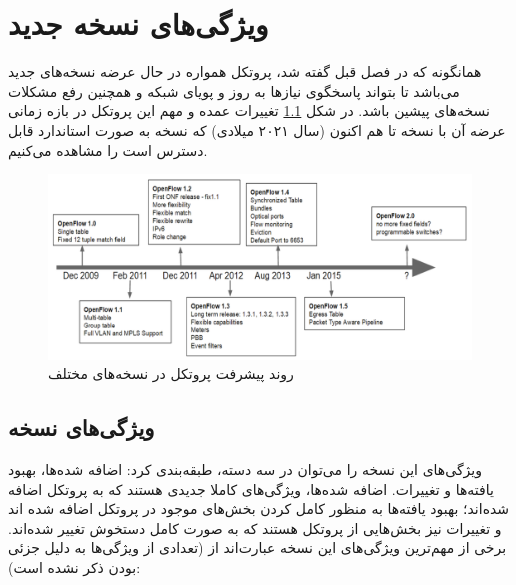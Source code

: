 \chapter{ویژگی‌های نسخه جدید }
همانگونه که در فصل قبل گفته شد، پروتکل  همواره در حال عرضه نسخه‌های جدید می‌باشد تا بتواند پاسخگوی نیاز‌ها به روز و پویای شبکه و همچنین رفع مشکلات نسخه‌های پیشین باشد. در شکل \ref{fig7} تغییرات عمده و مهم این پروتکل در بازه زمانی عرضه آن با نسخه  تا هم اکنون (سال ۲۰۲۱ میلادی) که نسخه  به صورت استاندارد قابل دسترس است را مشاهده می‌کنیم.

\begin{figure}[H]
	\centering
	\includegraphics[scale=0.4]{imgs/of_timeline.png}
	\caption{روند پیشرفت پروتکل در نسخه‌های مختلف}
	\label{fig7}
\end{figure}

\pagebreak

\section{ویژگی‌های نسخه }
ویژگی‌های این نسخه را می‌توان در سه دسته، طبقه‌بندی کرد: اضافه شده‌ها، بهبود یافته‌ها و تغییرات. اضافه شده‌ها، ویژگی‌های کاملا جدیدی هستند که به پروتکل اضافه شده‌اند؛ بهبود یافته‌ها به منظور کامل کردن بخش‌های موجود در پروتکل اضافه شده اند و تغییرات نیز بخش‌هایی از پروتکل هستند که به صورت کامل دستخوش تغییر شده‌اند.
برخی از مهم‌ترین ویژگی‌های این نسخه عبارت‌اند از (تعدادی از ويژگی‌ها به دلیل جزئی بودن ذکر نشده است):

